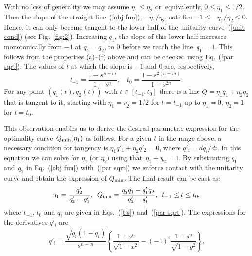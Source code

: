 \documentclass[aps,prl,twocolumn,showpacs]{revtex4}
\begin{document}
With no loss of generality we may assume $\eta_1\le\eta_2$ or, equivalently,  $0\le\eta_1\le 1/2$. Then the slope of the straight line~(\ref{obj fun}), $-\eta_{1}/ \eta_{2}$, satisfies $-1\leq -\eta_{1}/\eta_{2} \leq0$. Hence, it can only become tangent to the lower half of the unitarity curve~(\ref{unit cond}) (see Fig.~\ref{fig:2}). %
Increasing $q_{1}$, the slope of this lower half increases monotonically from $-1$ at $q_1=q_2$, to $0$ before we reach the line~$q_1=1$. This follows from the properties (a)--(f) above and can be checked using  Eq.~(\ref{par sqrt}). The values of $t$ at which the slope is $-1$ and $0$ are, respectively,
%
\begin{equation}
t_{-1}=\frac{1-s^{n-m}}{1-s^n},\quad
t_0=\frac{1-s^{2(n-m)}}{1-s^{2n}}.
\label{t's}
\end{equation}
%
For any point $(q_1(t),q_2(t))$ with $t\in[t_{-1},t_0]$ there is a line $Q=\eta_1 q_1+\eta_2 q_2$ that is tangent to it, starting with $\eta_1=\eta_2=1/2$ for $t=t_{-1}$ up to $\eta_1=0$, $\eta_2=1$ for $t=t_0$. 

This observation enables us to derive the desired parametric expression for the optimality curve~$Q_{\rm min}(\eta_1)$ as follows. For a given $t$ in the range above, a necessary condition for tangency is \mbox{$\eta_1 q'_1+\eta_2 q'_2=0$}, where $q'_i=d q_i/d t$. In this equation we can solve for $\eta_1$ (or $\eta_2$) using that~$\eta_1+\eta_2=1$. By substituting $q_1$ and~$q_2$ in Eq.~(\ref{obj fun}) with~(\ref{par sqrt}) we enforce contact with the unitarity curve and obtain the expression of $Q_{\rm min}$. The final result can be cast as:
%
\begin{equation}
\eta_1=\frac{q'_2}{q'_2-q'_1},\;\; Q_{\rm min}=\frac{q'_2 q_1-q'_1 q_2}{q'_2-q'_1},\;\; t_{-1}\le t\le t_0,
\label{main}
\end{equation}
%
where $t_{-1}$, $t_0$ and $q_i$ are given in Eqs.~(\ref{t's}) and~(\ref{par sqrt}). The expressions for the derivatives $q'_i$ are %
%
\begin{equation}
q'_i=\frac{\sqrt{q_i(1-q_i)}}{s^{n-m}}\left\{\frac{1+s^n}{\sqrt{1-x^2}}-(-1)^i\frac{1-s^n}{\sqrt{1-y^2}}\right\}.
\end{equation}
%
\end{document}

